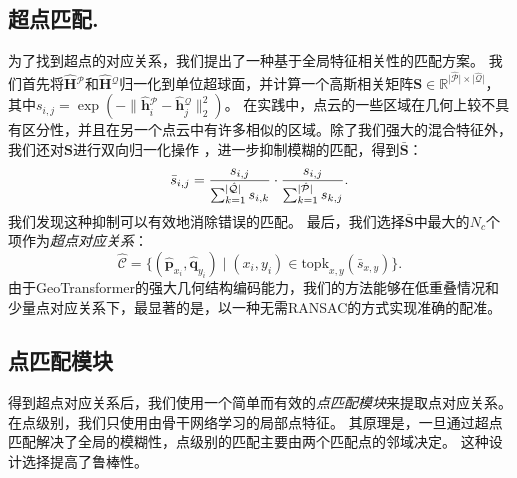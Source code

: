 \subsection{超点匹配.}
%
为了找到超点的对应关系，我们提出了一种基于全局特征相关性的匹配方案。
我们首先将$\hat{\textbf{H}}{}^{\mathcal{P}}$和$\hat{\textbf{H}}{}^{\mathcal{Q}}$归一化到单位超球面，并计算一个高斯相关矩阵$\textbf{S} \in \mathbb{R}^{\lvert \hat{\mathcal{P}} \rvert \times \lvert \hat{\mathcal{Q}} \rvert}$，其中$s_{i, j} = \exp(-\lVert \hat{\textbf{h}}{}^{\mathcal{P}}_i - \hat{\textbf{h}}{}^{\mathcal{Q}}_j\rVert_2^2)$。
在实践中，点云的一些区域在几何上较不具有区分性，并且在另一个点云中有许多相似的区域。除了我们强大的混合特征外，我们还对$\textbf{S}$进行双向归一化操作 \cite{rocco2018neighbourhood,sun2021loftr}，进一步抑制模糊的匹配，得到$\bar{\textbf{S}}$：
\vspace{-2pt}
\begin{equation}
\bar{s}_{i, j} = \frac{s_{i, j}}{\sum_{k=1}^{\lvert \hat{\mathcal{Q}} \rvert} s_{i, k}} \cdot \frac{s_{i, j}}{\sum_{k=1}^{\lvert \hat{\mathcal{P}} \rvert} s_{k, j}}.
\vspace{-2pt}
\end{equation}
我们发现这种抑制可以有效地消除错误的匹配。
最后，我们选择$\bar{\textbf{S}}$中最大的$N_{c}$个项作为\emph{超点对应关系}：
\begin{equation}
\hat{\mathcal{C}} = \{ (\hat{\textbf{p}}_{x_i}, \hat{\textbf{q}}_{y_i}) \mid (x_i, y_i) \in \mathrm{topk}_{x, y}(\bar{s}_{x, y}) \}.
\end{equation}
由于GeoTransformer的强大几何结构编码能力，我们的方法能够在低重叠情况和少量点对应关系下，最显著的是，以一种无需RANSAC的方式实现准确的配准。

\subsection{点匹配模块}
\label{sec:model-pom}

得到超点对应关系后，我们使用一个简单而有效的\emph{点匹配模块}来提取点对应关系。
在点级别，我们只使用由骨干网络学习的局部点特征。
其原理是，一旦通过超点匹配解决了全局的模糊性，点级别的匹配主要由两个匹配点的邻域决定。
这种设计选择提高了鲁棒性。

